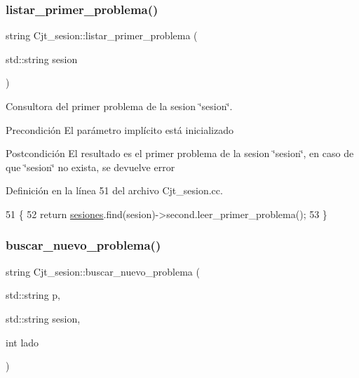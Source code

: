 \subsubsection{\texorpdfstring{listar\+\_\+primer\+\_\+problema()}{listar\_primer\_problema()}}
{\footnotesize\ttfamily string Cjt\+\_\+sesion\+::listar\+\_\+primer\+\_\+problema (\begin{DoxyParamCaption}\item[{std\+::string}]{sesion }\end{DoxyParamCaption})}



Consultora del primer problema de la sesion \char`\"{}sesion\char`\"{}. 

\begin{DoxyPrecond}{Precondición}
El parámetro implícito está inicializado 
\end{DoxyPrecond}
\begin{DoxyPostcond}{Postcondición}
El resultado es el primer problema de la sesion \char`\"{}sesion\char`\"{}, en caso de que \char`\"{}sesion\char`\"{} no exista, se devuelve error 
\end{DoxyPostcond}


Definición en la línea 51 del archivo Cjt\+\_\+sesion.\+cc.


\begin{DoxyCode}
51                                                        \{
52     \textcolor{keywordflow}{return} \mbox{\hyperlink{class_cjt__sesion_abac1c2ee3cccc598a8274c7da869aa9b}{sesiones}}.find(sesion)->second.leer\_primer\_problema();
53 \}
\end{DoxyCode}
\mbox{\label{class_cjt__sesion_a4aef15fb48b0465b864eaebeb3808cd0}} 
\subsubsection{\texorpdfstring{buscar\+\_\+nuevo\+\_\+problema()}{buscar\_nuevo\_problema()}}
{\footnotesize\ttfamily string Cjt\+\_\+sesion\+::buscar\+\_\+nuevo\+\_\+problema (\begin{DoxyParamCaption}\item[{std\+::string}]{p,  }\item[{std\+::string}]{sesion,  }\item[{int}]{lado }\end{DoxyParamCaption})}



